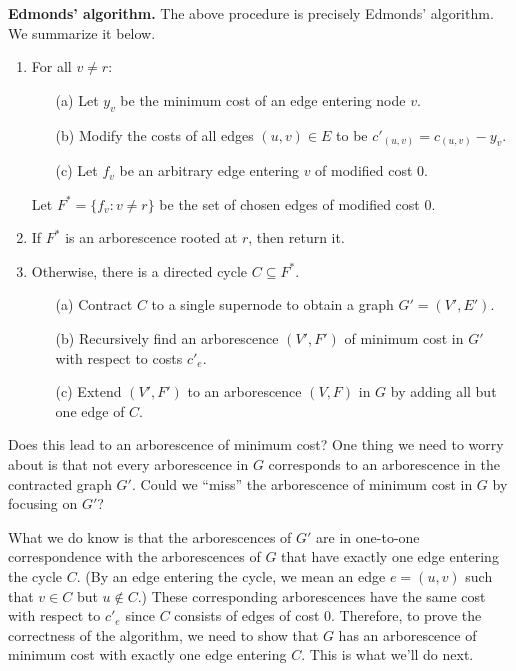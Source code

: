 \documentclass{article}
\begin{document}
{\color{violet}
{\bf Edmonds' algorithm.} The above procedure is precisely Edmonds' algorithm. 
We summarize it below. 
\begin{enumerate}
    \item For all $v \neq r$: 
    \begin{enumerate}
        \item [(a)] Let $y_v$ be the minimum cost of an edge entering node $v$. 
        \item [(b)] Modify the costs of all edges $(u, v) \in E$ to be 
        $c'_{(u, v)} = c_{(u, v)} - y_v$. 
        \item [(c)] Let $f_v$ be an arbitrary edge entering $v$ of modified cost $0$.
    \end{enumerate}
    Let $F^* = \{f_v : v \neq r\}$ be the set of chosen edges of modified cost $0$. 
    \item If $F^*$ is an arborescence rooted at $r$, then return it. 
    \item Otherwise, there is a directed cycle $C \subseteq F^*$. 
    \begin{enumerate}
        \item [(a)] Contract $C$ to a single supernode to obtain a graph $G' = (V', E')$. 
        \item [(b)] Recursively find an arborescence $(V', F')$ of minimum cost in $G'$ 
        with respect to costs $c'_e$. 
        \item [(c)] Extend $(V', F')$ to an arborescence $(V, F)$ in $G$ by adding 
        all but one edge of $C$. 
    \end{enumerate}
\end{enumerate}
}

Does this lead to an arborescence of minimum cost? One thing we need to 
worry about is that not every arborescence in $G$ corresponds to 
an arborescence in the contracted graph $G'$. Could we ``miss'' the 
arborescence of minimum cost in $G$ by focusing on $G'$? 

What we do know is that the arborescences of $G'$ are in one-to-one 
correspondence with the arborescences of $G$ that have 
exactly one edge entering the cycle $C$. (By an edge entering the cycle, 
we mean an edge $e = (u, v)$ such that 
$v \in C$ but $u \notin C$.) These corresponding 
arborescences have the same cost with respect to $c'_e$ since 
$C$ consists of edges of cost $0$. Therefore, to prove the correctness of 
the algorithm, we need to show that $G$ has an arborescence of 
minimum cost with exactly one edge entering $C$. This is what we'll do next. 
\end{document}
